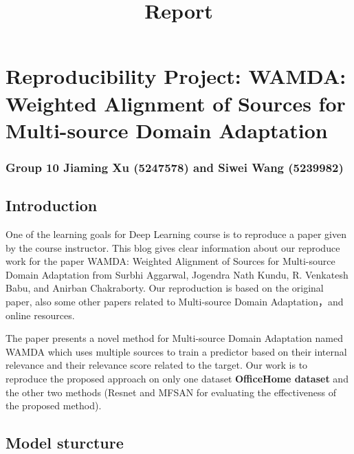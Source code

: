\documentclass[11pt]{article}
\title{Report}
\begin{document}
    
    
    \maketitle
    
    

    
    \hypertarget{reproducibility-project-wamda-weighted-alignment-of-sources-for-multi-source-domain-adaptation}{%
\section{Reproducibility Project: WAMDA: Weighted Alignment of Sources
for Multi-source Domain
Adaptation}\label{reproducibility-project-wamda-weighted-alignment-of-sources-for-multi-source-domain-adaptation}}

    \hypertarget{group-10-jiaming-xu-5247578-and-siwei-wang-5239982}{%
\subsubsection{Group 10 Jiaming Xu (5247578) and Siwei Wang
(5239982)}\label{group-10-jiaming-xu-5247578-and-siwei-wang-5239982}}

    \hypertarget{introduction}{%
\subsection{Introduction}\label{introduction}}

One of the learning goals for Deep Learning course is to reproduce a
paper given by the course instructor. This blog gives clear information
about our reproduce work for the paper WAMDA: Weighted Alignment of
Sources for Multi-source Domain Adaptation from Surbhi Aggarwal,
Jogendra Nath Kundu, R. Venkatesh Babu, and Anirban Chakraborty. Our
reproduction is based on the original paper, also some other papers
related to Multi-source Domain Adaptation，and online resources.

The paper presents a novel method for Multi-source Domain Adaptation
named WAMDA which uses multiple sources to train a predictor based on
their internal relevance and their relevance score related to the
target. Our work is to reproduce the proposed approach on only one
dataset \textbf{OfficeHome dataset} and the other two methods (Resnet
and MFSAN for evaluating the effectiveness of the proposed method).

    \hypertarget{model-sturcture}{%
\subsection{Model sturcture}\label{model-sturcture}}
\end{document}
